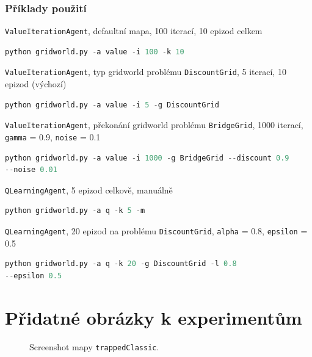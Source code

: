 \subsection{Příklady použití}
\texttt{ValueIterationAgent}, defaultní mapa, 100 iterací, 10 epizod celkem
\begin{lstlisting}[language=Python,texcl=true]
python gridworld.py -a value -i 100 -k 10
\end{lstlisting}
\texttt{ValueIterationAgent}, typ gridworld problému \texttt{DiscountGrid}, 5 iterací, 10 epizod (výchozí)
\begin{lstlisting}[language=Python,texcl=true]
python gridworld.py -a value -i 5 -g DiscountGrid
\end{lstlisting}
\texttt{ValueIterationAgent}, překonání gridworld problému \texttt{BridgeGrid}, 1000 iterací, \texttt{gamma} = 0.9, \texttt{noise} =  0.1
\begin{lstlisting}[language=Python,texcl=true]
python gridworld.py -a value -i 1000 -g BridgeGrid --discount 0.9
--noise 0.01
\end{lstlisting}
\texttt{QLearningAgent}, 5 epizod celkově, manuálně
\begin{lstlisting}[language=Python,texcl=true]
python gridworld.py -a q -k 5 -m
\end{lstlisting}
\texttt{QLearningAgent}, 20 epizod na problému \texttt{DiscountGrid}, \texttt{alpha} = 0.8, \texttt{epsilon} = 0.5
\begin{lstlisting}[language=Python,texcl=true]
python gridworld.py -a q -k 20 -g DiscountGrid -l 0.8
--epsilon 0.5
\end{lstlisting}

\chapter{Přidatné obrázky k experimentům}
\label{pril:experobr}
\begin{figure}[!htbp]
\begin{center}
  \caption{Screenshot mapy \texttt{trappedClassic}.}
  \label{img:trapped}
\end{center}
\end{figure}


